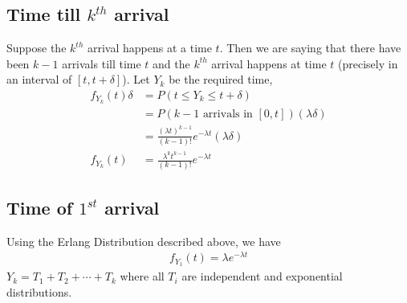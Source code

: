 \documentclass[11pt, a4paper]{article}
\begin{document}
    \subsection{Time till $k^{th}$ arrival}
    Suppose the $k^{th}$ arrival happens at a time $t$. Then we are saying that there have been $k-1$ arrivals till time $t$ and the $k^{th}$ arrival happens at time $t$ (precisely in an interval of $[t, t+\delta]$). Let $Y_{k}$ be the required time,
    \begin{align*}
        f_{Y_{k}}(t)\delta &= P(t \leq Y_{k} \leq t+\delta)\\
                    &= P(\text{$k-1$ arrivals  in $[0,t]$}) (\lambda \delta)\\
                    &= \frac{(\lambda t)^{k-1}}{(k-1)!}e^{-\lambda t}(\lambda \delta)\\
        f_{Y_{k}}(t) &= \frac{\lambda^{k} t^{k-1}}{(k-1)!}e^{-\lambda t} \tag*{Erland Distribution}
    \end{align*}

    \subsection{Time of $1^{st}$ arrival}
    Using the Erlang Distribution described above, we have
    \begin{align*}
        f_{Y_{1}}(t) = \lambda e^{-\lambda t}
    \end{align*}
    $Y_{k} = T_{1} + T_{2} + \cdots + T_{k}$ where all $T_{i}$ are independent and exponential distributions.
\end{document}
